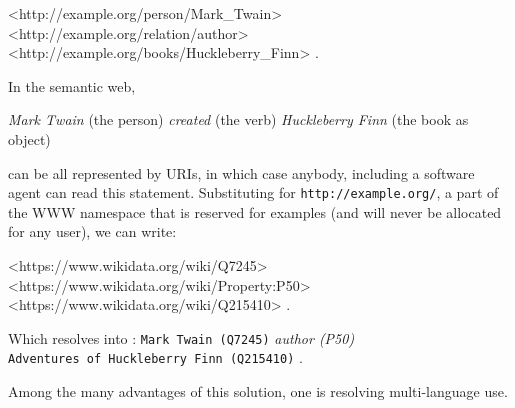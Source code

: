 \documentclass[
  letterpaper,
  DIV=11,
  numbers=noendperiod]{scrreprt}
\newenvironment{Shaded}{\begin{snugshade}}{\end{snugshade}}
\newcommand{\ErrorTok}[1]{\textcolor[rgb]{0.68,0.00,0.00}{#1}}
\newcommand{\NormalTok}[1]{\textcolor[rgb]{0.00,0.23,0.31}{#1}}
\newcommand{\SpecialCharTok}[1]{\textcolor[rgb]{0.37,0.37,0.37}{#1}}
\begin{document}
\begin{Shaded}
\begin{Highlighting}[]
\SpecialCharTok{\textless{}}\NormalTok{http}\SpecialCharTok{:}\ErrorTok{//}\NormalTok{example.org}\SpecialCharTok{/}\NormalTok{person}\SpecialCharTok{/}\NormalTok{Mark\_Twain}\SpecialCharTok{\textgreater{}}
   \ErrorTok{\textless{}}\NormalTok{http}\SpecialCharTok{:}\ErrorTok{//}\NormalTok{example.org}\SpecialCharTok{/}\NormalTok{relation}\SpecialCharTok{/}\NormalTok{author}\SpecialCharTok{\textgreater{}}
   \ErrorTok{\textless{}}\NormalTok{http}\SpecialCharTok{:}\ErrorTok{//}\NormalTok{example.org}\SpecialCharTok{/}\NormalTok{books}\SpecialCharTok{/}\NormalTok{Huckleberry\_Finn}\SpecialCharTok{\textgreater{}}\NormalTok{ .}
\end{Highlighting}
\end{Shaded}

In the semantic web,

\emph{Mark Twain} (the person) \emph{created} (the verb)
\emph{Huckleberry Finn} (the book as object)

can be all represented by URIs, in which case anybody, including a
software agent can read this statement. Substituting for
\texttt{http://example.org/}, a part of the WWW namespace that is
reserved for examples (and will never be allocated for any user), we can
write:

\begin{Shaded}
\begin{Highlighting}[]
\SpecialCharTok{\textless{}}\NormalTok{https}\SpecialCharTok{:}\ErrorTok{//}\NormalTok{www.wikidata.org}\SpecialCharTok{/}\NormalTok{wiki}\SpecialCharTok{/}\NormalTok{Q7245}\SpecialCharTok{\textgreater{}}
   \ErrorTok{\textless{}}\NormalTok{https}\SpecialCharTok{:}\ErrorTok{//}\NormalTok{www.wikidata.org}\SpecialCharTok{/}\NormalTok{wiki}\SpecialCharTok{/}\NormalTok{Property}\SpecialCharTok{:}\NormalTok{P50}\SpecialCharTok{\textgreater{}}
   \ErrorTok{\textless{}}\NormalTok{https}\SpecialCharTok{:}\ErrorTok{//}\NormalTok{www.wikidata.org}\SpecialCharTok{/}\NormalTok{wiki}\SpecialCharTok{/}\NormalTok{Q215410}\SpecialCharTok{\textgreater{}}\NormalTok{ .}
\end{Highlighting}
\end{Shaded}

Which resolves into : \texttt{Mark\ Twain\ (Q7245)} \emph{author (P50)}
\texttt{Adventures\ of\ Huckleberry\ Finn\ (Q215410)} .

Among the many advantages of this solution, one is resolving
multi-language use.
\end{document}
